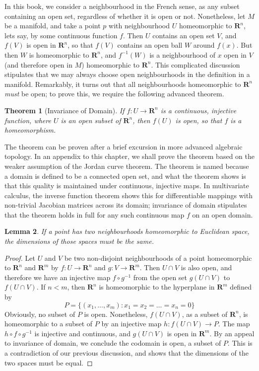\documentclass[12pt]{report}
\theoremstyle{plain}
\newtheorem{theorem}{Theorem}[chapter]
\newtheorem{lemma}[theorem]{Lemma}
\theoremstyle{definition}
\begin{document}
In this book, we consider a neighbourhood in the French sense, as any subset containing an open set, regardless of whether it is open or not. Nonetheless, let $M$ be a manifold, and take a point $p$ with neighbourhood $U$ homeomorphic to $\mathbf{R}^n$, lets say, by some continuous function $f$. Then $U$ contains an open set $V$, and $f(V)$ is open in $\mathbf{R}^n$, so that $f(V)$ contains an open ball $W$ around $f(x)$. But then $W$ is homeomorphic to $\mathbf{R}^n$, and $f^{-1}(W)$ is a neighbourhood of $x$ open in $V$ (and therefore open in $M$) homeomorphic to $\mathbf{R}^n$. This complicated discussion stipulates that we may always choose open neighbourhoods in the definition in a manifold. Remarkably, it turns out that all neighbourhoods homeomorphic to $\mathbf{R}^n$ {\it must} be open; to prove this, we require the following advanced theorem.


\begin{theorem}[Invariance of Domain]
    If $f:U \to \mathbf{R}^n$ is a continuous, injective function, where $U$ is an open subset of $\mathbf{R}^n$, then $f(U)$ is open, so that $f$ is a homeomorphism.
\end{theorem}

The theorem can be proven after a brief excursion in more advanced algebraic topology. In an appendix to this chapter, we shall prove the theorem based on the weaker assumption of the Jordan curve theorem. The theorem is named because a domain is defined to be a connected open set, and what the theorem shows is that this quality is maintained under continuous, injective maps. In multivariate calculus, the inverse function theorem shows this for differentiable mappings with non-trivial Jacobian matrices across its domain; invariance of domain stipulates that the theorem holds in full for any such continuous map $f$ on an open domain.

\begin{lemma}
    If a point has two neighbourhoods homeomorphic to Euclidean space, the dimensions of those spaces must be the same.
\end{lemma}
\begin{proof}
    Let $U$ and $V$ be two non-disjoint neighbourhoods of a point homeomorphic to $\mathbf{R}^n$ and $\mathbf{R}^m$ by $f:U \to \mathbf{R}^n$ and $g:V \to \mathbf{R}^m$. Then $U \cap V$ is also open, and therefore we have an injective map $f \circ g^{-1}$ from the open set $g(U \cap V)$ to $f(U \cap V)$. If $n < m$, then $\mathbf{R}^n$ is homeomorphic to the hyperplane in $\mathbf{R}^m$ defined by
    \[ P = \{ (x_1, \dots, x_m): x_1 = x_2 = \dots = x_n = 0 \} \]
    Obviously, no subset of $P$ is open. Nonetheless, $f(U \cap V)$, as a subset of $\mathbf{R}^n$, is homeomorphic to a subset of $P$ by an injective map $h: f(U \cap V) \to P$. The map $h \circ f \circ g^{-1}$ is injective and continuous, and $g(U \cap V)$ is open in $\mathbf{R}^m$. By an appeal to invariance of domain, we conclude the codomain is open, a subset of $P$. This is a contradiction of our previous discussion, and shows that the dimensions of the two spaces must be equal.
\end{proof}
\end{document}
